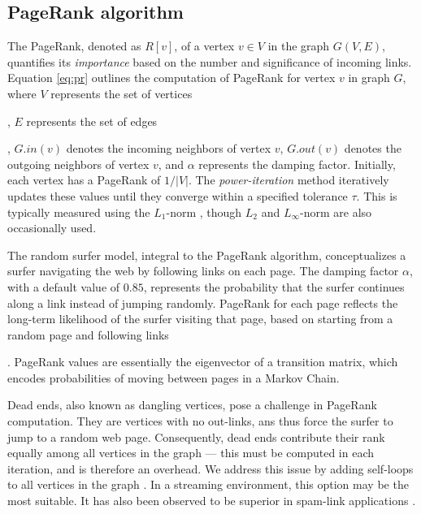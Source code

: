 \subsection{PageRank algorithm}
\label{sec:pagerank}

The PageRank, denoted as $R[v]$, of a vertex $v \in V$ in the graph $G(V, E)$, quantifies its \textit{importance} based on the number and significance of incoming links. Equation \ref{eq:pr} outlines the computation of PageRank for vertex $v$ in graph $G$, where $V$ represents the set of vertices, $E$ represents the set of edges, $G.in(v)$ denotes the incoming neighbors of vertex $v$, $G.out(v)$ denotes the outgoing neighbors of vertex $v$, and $\alpha$ represents the damping factor. Initially, each vertex has a PageRank of $1/|V|$. The \textit{power-iteration} method iteratively updates these values until they converge within a specified tolerance $\tau$. This is typically measured using the $L_1$-norm \cite{ohsaka2015efficient}, though $L_2$ and $L_\infty$-norm are also occasionally used.

The random surfer model, integral to the PageRank algorithm, conceptualizes a surfer navigating the web by following links on each page. The damping factor $\alpha$, with a default value of $0.85$, represents the probability that the surfer continues along a link instead of jumping randomly. PageRank for each page reflects the long-term likelihood of the surfer visiting that page, based on starting from a random page and following links. PageRank values are essentially the eigenvector of a transition matrix, which encodes probabilities of moving between pages in a Markov Chain.

Dead ends, also known as dangling vertices, pose a challenge in PageRank computation. They are vertices with no out-links, ans thus force the surfer to jump to a random web page. Consequently, dead ends contribute their rank equally among all vertices in the graph --- this must be computed in each iteration, and is therefore an overhead. We address this issue by adding self-loops to all vertices in the graph \cite{kolda2009generalized, rank-andersen07, rank-langville06}. In a streaming environment, this option may be the most suitable. It has also been observed to be superior in spam-link applications \cite{kolda2009generalized}.

